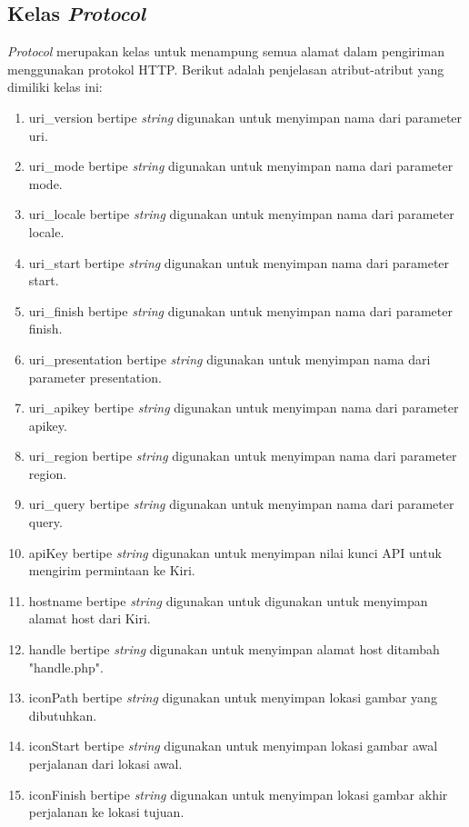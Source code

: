 \subsection{Kelas \textit{Protocol}}
\label{lab:Kelas Protocol}
\hspace{0.5cm} \textit{Protocol} merupakan kelas untuk menampung semua alamat dalam pengiriman menggunakan protokol HTTP. Berikut adalah penjelasan atribut-atribut yang dimiliki kelas ini:
\begin{enumerate}
	\item uri\_version bertipe \textit{string} digunakan untuk menyimpan nama dari parameter uri.
	\item uri\_mode bertipe \textit{string} digunakan untuk menyimpan nama dari parameter mode.
	\item uri\_locale bertipe \textit{string} digunakan untuk menyimpan nama dari parameter locale.
	\item uri\_start bertipe \textit{string} digunakan untuk menyimpan nama dari parameter start.
	\item uri\_finish bertipe \textit{string} digunakan untuk menyimpan nama dari parameter finish.
	\item uri\_presentation bertipe \textit{string} digunakan untuk menyimpan nama dari parameter presentation.
	\item uri\_apikey bertipe \textit{string} digunakan untuk menyimpan nama dari parameter apikey.
	\item uri\_region bertipe \textit{string} digunakan untuk menyimpan nama dari parameter region.
	\item uri\_query bertipe \textit{string} digunakan untuk menyimpan nama dari parameter query.

	\item apiKey bertipe \textit{string} digunakan untuk menyimpan nilai kunci API untuk mengirim permintaan ke Kiri.
	\item hostname bertipe \textit{string} digunakan untuk digunakan untuk menyimpan alamat host dari Kiri.
	\item handle bertipe \textit{string} digunakan untuk menyimpan alamat host ditambah "handle.php".
	\item iconPath bertipe \textit{string} digunakan untuk menyimpan lokasi gambar yang dibutuhkan.
	\item iconStart bertipe \textit{string} digunakan untuk menyimpan lokasi gambar awal perjalanan dari lokasi awal.
	\item iconFinish bertipe \textit{string} digunakan untuk menyimpan lokasi gambar akhir perjalanan ke lokasi tujuan.
	

\end{enumerate}
